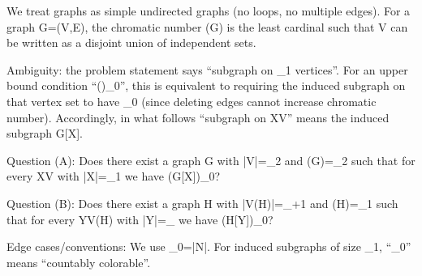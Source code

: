 We treat graphs as simple undirected graphs (no loops, no multiple edges).
For a graph G=(V,E), the chromatic number \chi(G) is the least cardinal \kappa such that V can be written as a disjoint union of \kappa independent sets.

Ambiguity: the problem statement says “subgraph on \aleph_1 vertices”.
For an upper bound condition “\chi(\cdot)\le\aleph_0”, this is equivalent to requiring the induced subgraph on that vertex set to have \chi\le\aleph_0 (since deleting edges cannot increase chromatic number).
Accordingly, in what follows “subgraph on X\subseteq V” means the induced subgraph G[X].

Question (A): Does there exist a graph G with |V|=\aleph_2 and \chi(G)=\aleph_2 such that for every X\subseteq V with |X|=\aleph_1 we have \chi(G[X])\le \aleph_0?

Question (B): Does there exist a graph H with |V(H)|=\aleph_{\omega+1} and \chi(H)=\aleph_1 such that for every Y\subseteq V(H) with |Y|=\aleph_{\omega} we have \chi(H[Y])\le \aleph_0?

Edge cases/conventions: We use \aleph_0=|\mathbb N|. For induced subgraphs of size \aleph_1, “\chi\le \aleph_0” means “countably colorable”.
